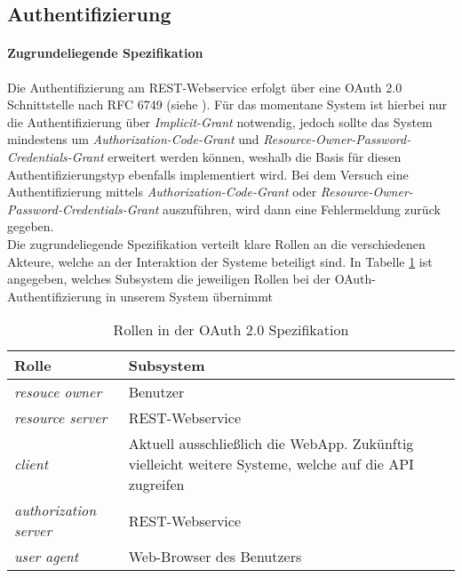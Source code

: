 \subsection{Authentifizierung}
\label{subsec:api-auth}
\paragraph{Zugrundeliegende Spezifikation} Die Authentifizierung am REST-Webservice erfolgt über eine OAuth 2.0 Schnittstelle nach RFC 6749 (siehe \cite{rfc6749}).
Für das momentane System ist hierbei nur die Authentifizierung über \textit{Implicit-Grant} \cite[Kap. 4.2]{rfc6749} notwendig, jedoch sollte das System mindestens um \textit{Authorization-Code-Grant} \cite[Kap. 4.1]{rfc6749} und \textit{Resource-Owner-Password-Credentials-Grant} \cite[Kap. 4.3]{rfc6749} erweitert werden können, weshalb die Basis für diesen Authentifizierungstyp ebenfalls implementiert wird. Bei dem Versuch eine Authentifizierung mittels \textit{Authorization-Code-Grant} oder \textit{Resource-Owner-Password-Credentials-Grant} auszuführen, wird dann eine Fehlermeldung zurück gegeben.\\
Die zugrundeliegende Spezifikation verteilt klare Rollen an die verschiedenen Akteure, welche an der Interaktion der Systeme beteiligt sind. In Tabelle \ref{tab:api-auth-roles} ist angegeben, welches Subsystem die jeweiligen Rollen bei der OAuth-Authentifizierung in unserem System übernimmt

\begin{table}
	\begin{tabularx}{\textwidth}{@{} | X | X | @{}}
		\hline
		\textbf{Rolle} & \textbf{Subsystem}\\ \hline \hline
		\textit{resouce owner} & Benutzer \\ \hline
		\textit{resource server} & REST-Webservice \\ \hline
		\textit{client} & Aktuell ausschließlich die WebApp. Zukünftig vielleicht weitere Systeme, welche auf die API zugreifen \\ \hline
		\textit{authorization server} & REST-Webservice \\ \hline
		\textit{user agent} & Web-Browser des Benutzers \\
		\hline
	\end{tabularx}
	\caption{Rollen in der OAuth 2.0 Spezifikation}
	\label{tab:api-auth-roles}
\end{table}

